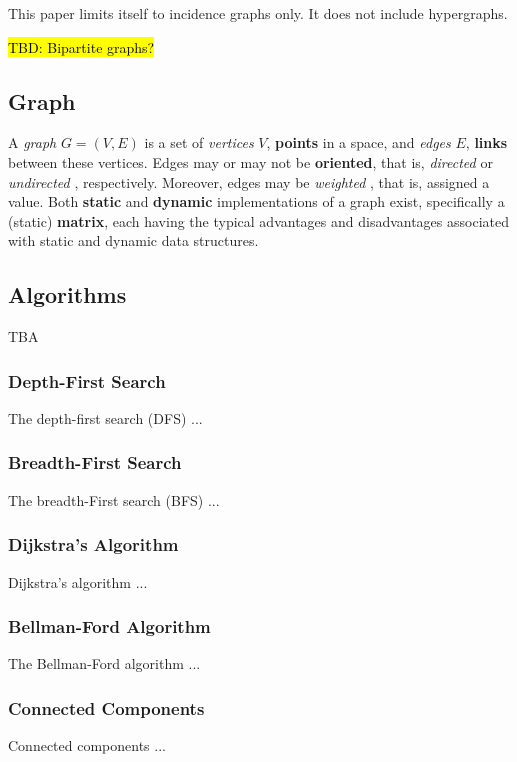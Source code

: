 \documentclass[10pt,onecolumn]{article}
\begin{document}
This paper limits itself to incidence graphs only. It does not include hypergraphs.

\hl{TBD: Bipartite graphs?}

\subsection{Graph}
 A \textit{graph} \cite{REF_graph} $G = (V, E)$ is a set of \textit{vertices} \cite{REF_graph} $V$, \textbf{points} in a space, and \textit{edges} \cite{REF_graph} $E$, \textbf{links} between these vertices. Edges may or may not be \textbf{oriented}, that is, \textit{directed} \cite{REF_graph} or \textit{undirected} \cite{REF_graph}, respectively. Moreover, edges may be \textit{weighted} \cite{REF_graph}, that is, assigned a value. Both \textbf{static} and \textbf{dynamic} implementations of a graph exist, specifically a (static) \textbf{matrix}, each having the typical advantages and disadvantages associated with static and dynamic data structures.

\subsection{Algorithms}
TBA

\subsubsection{Depth-First Search}
The depth-first search \cite{REF_graph} (DFS) ...

\subsubsection{Breadth-First Search}
The breadth-First search \cite{REF_graph} (BFS) ...

\subsubsection{Dijkstra's Algorithm}
Dijkstra's algorithm \cite{REF_} ...

\subsubsection{Bellman-Ford Algorithm}
The Bellman-Ford algorithm \cite{REF_} ...

\subsubsection{Connected Components}
Connected components \cite{REF_} ...
\end{document}
